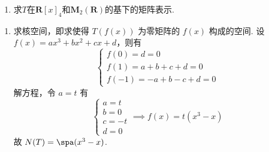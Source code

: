 \begin{exercise}
\begin{exgroup}
\begin{enumerate}
            \item 求$T$在$\mathbf{R}[x]_4$和$\mathbf{M}_2(\mathbf{R})$的基下的矩阵表示.
        \end{enumerate}

        \begin{answer}
            \begin{enumerate}
                \item \label{item:7:B:5:1}
                      求核空间，即求使得 $ T(f(x)) $ 为零矩阵的 $ f(x) $ 构成的空间. 设 $ f(x) = ax^3 + bx^2 + cx + d $，则有
                      \[ \begin{cases}
                              f(0) = d = 0             \\
                              f(1) = a + b + c + d = 0 \\
                              f(-1) = -a + b -c + d = 0
                          \end{cases} \]
                      解方程，令 $ a = t $ 有
                      \[ \begin{cases}
                              a = t  \\
                              b = 0  \\
                              c = -t \\
                              d = 0
                          \end{cases} \implies f(x) = t(x^3 - x) \]
                      故 $ N(T) = \spa(x^3 - x) $.


\end{enumerate}
\end{answer}
\end{exgroup}
\end{exercise}
